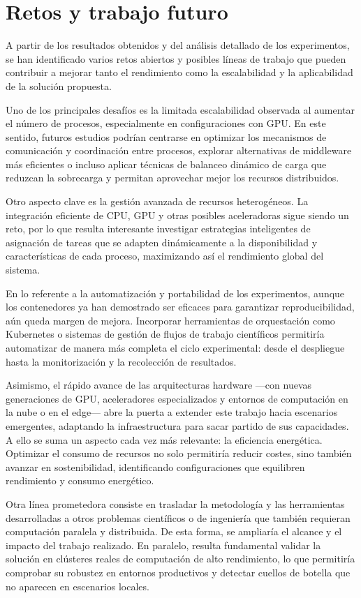 \section{Retos y trabajo futuro}

A partir de los resultados obtenidos y del análisis detallado de los experimentos, se han identificado varios retos abiertos y posibles líneas de trabajo que pueden contribuir a mejorar tanto el rendimiento como la escalabilidad y la aplicabilidad de la solución propuesta.

Uno de los principales desafíos es la limitada escalabilidad observada al aumentar el número de procesos, especialmente en configuraciones con GPU. En este sentido, futuros estudios podrían centrarse en optimizar los mecanismos de comunicación y coordinación entre procesos, explorar alternativas de middleware más eficientes o incluso aplicar técnicas de balanceo dinámico de carga que reduzcan la sobrecarga y permitan aprovechar mejor los recursos distribuidos.

Otro aspecto clave es la gestión avanzada de recursos heterogéneos. La integración eficiente de CPU, GPU y otras posibles aceleradoras sigue siendo un reto, por lo que resulta interesante investigar estrategias inteligentes de asignación de tareas que se adapten dinámicamente a la disponibilidad y características de cada proceso, maximizando así el rendimiento global del sistema.

En lo referente a la automatización y portabilidad de los experimentos, aunque los contenedores ya han demostrado ser eficaces para garantizar reproducibilidad, aún queda margen de mejora. Incorporar herramientas de orquestación como Kubernetes o sistemas de gestión de flujos de trabajo científicos permitiría automatizar de manera más completa el ciclo experimental: desde el despliegue hasta la monitorización y la recolección de resultados.

Asimismo, el rápido avance de las arquitecturas hardware —con nuevas generaciones de GPU, aceleradores especializados y entornos de computación en la nube o en el edge— abre la puerta a extender este trabajo hacia escenarios emergentes, adaptando la infraestructura para sacar partido de sus capacidades. A ello se suma un aspecto cada vez más relevante: la eficiencia energética. Optimizar el consumo de recursos no solo permitiría reducir costes, sino también avanzar en sostenibilidad, identificando configuraciones que equilibren rendimiento y consumo energético.

Otra línea prometedora consiste en trasladar la metodología y las herramientas desarrolladas a otros problemas científicos o de ingeniería que también requieran computación paralela y distribuida. De esta forma, se ampliaría el alcance y el impacto del trabajo realizado. En paralelo, resulta fundamental validar la solución en clústeres reales de computación de alto rendimiento, lo que permitiría comprobar su robustez en entornos productivos y detectar cuellos de botella que no aparecen en escenarios locales.

